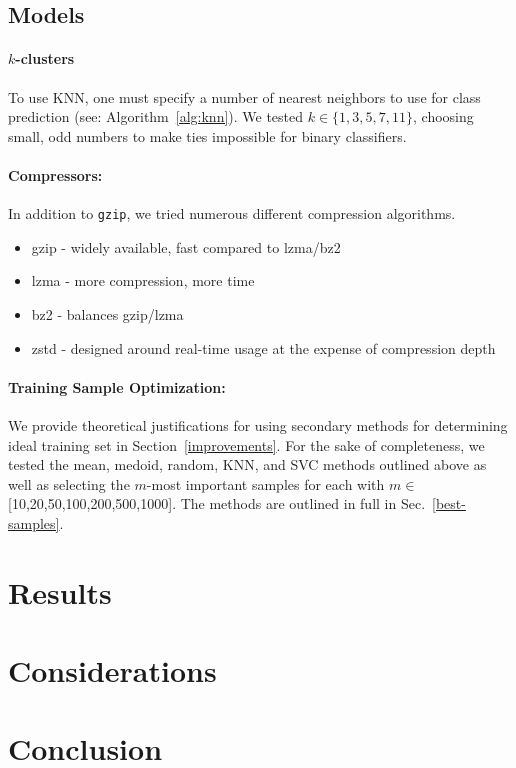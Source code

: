 \documentclass[sigconf]{acmart}
\begin{document}
\subsection{Models}

\paragraph{$k$-clusters}
To use KNN, one must specify a number of nearest neighbors to use for class prediction (see: Algorithm~\ref{alg:knn}). We tested $k \in \{1,3,5,7,11\}$, choosing small, odd numbers to make ties impossible for binary classifiers.
\paragraph{Compressors:} In addition to \texttt{gzip}, we tried numerous different compression algorithms. 
\begin{itemize}
    \item gzip - widely available, fast compared to lzma/bz2
    \item lzma - more compression, more time
    \item bz2 - balances gzip/lzma
    \item zstd - designed around real-time usage at the expense of compression depth
\end{itemize}

\paragraph{Training Sample Optimization:}
\label{methods}
We provide theoretical justifications for using secondary methods for determining ideal training set in Section~\ref{improvements}. For the sake of completeness, we tested the mean, medoid, random, KNN, and SVC methods outlined above as well as selecting the $m$-most important samples for each with $m \in$ [10,20,50,100,200,500,1000]. The methods are outlined in full in Sec.~\ref{best-samples}.


\section{Results}
\label{results}



\section{Considerations}
\label{considerations}
\section{Conclusion}
\label{conclusion}



\clearpage

\end{document}
